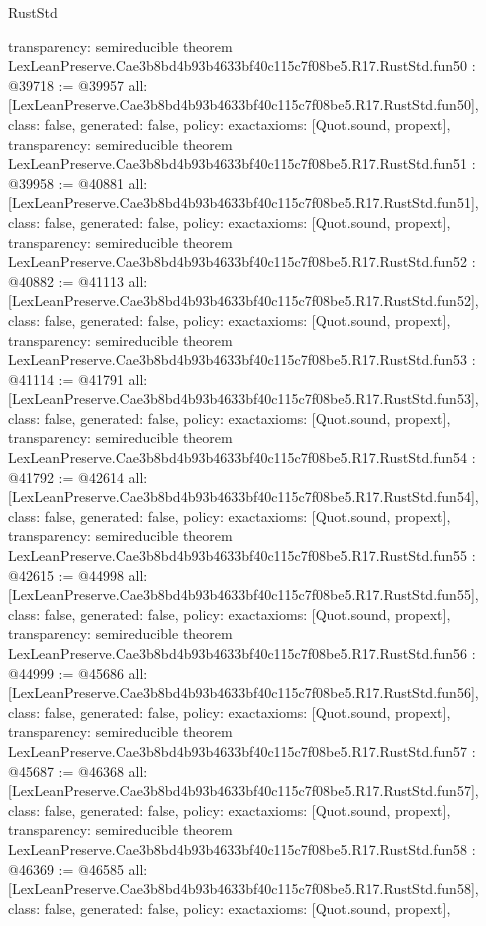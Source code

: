 \begin{lexlean}{RustStd}
\begin{coremodule}
{  transparency: semireducible
}
theorem LexLeanPreserve.Cae3b8bd4b93b4633bf40c115c7f08be5.R17.RustStd.fun50 : @39718 := @39957 {
  all: [LexLeanPreserve.Cae3b8bd4b93b4633bf40c115c7f08be5.R17.RustStd.fun50],
  class: false,
  generated: false,
  policy: exact{axioms: [Quot.sound, propext]},
  transparency: semireducible
}
theorem LexLeanPreserve.Cae3b8bd4b93b4633bf40c115c7f08be5.R17.RustStd.fun51 : @39958 := @40881 {
  all: [LexLeanPreserve.Cae3b8bd4b93b4633bf40c115c7f08be5.R17.RustStd.fun51],
  class: false,
  generated: false,
  policy: exact{axioms: [Quot.sound, propext]},
  transparency: semireducible
}
theorem LexLeanPreserve.Cae3b8bd4b93b4633bf40c115c7f08be5.R17.RustStd.fun52 : @40882 := @41113 {
  all: [LexLeanPreserve.Cae3b8bd4b93b4633bf40c115c7f08be5.R17.RustStd.fun52],
  class: false,
  generated: false,
  policy: exact{axioms: [Quot.sound, propext]},
  transparency: semireducible
}
theorem LexLeanPreserve.Cae3b8bd4b93b4633bf40c115c7f08be5.R17.RustStd.fun53 : @41114 := @41791 {
  all: [LexLeanPreserve.Cae3b8bd4b93b4633bf40c115c7f08be5.R17.RustStd.fun53],
  class: false,
  generated: false,
  policy: exact{axioms: [Quot.sound, propext]},
  transparency: semireducible
}
theorem LexLeanPreserve.Cae3b8bd4b93b4633bf40c115c7f08be5.R17.RustStd.fun54 : @41792 := @42614 {
  all: [LexLeanPreserve.Cae3b8bd4b93b4633bf40c115c7f08be5.R17.RustStd.fun54],
  class: false,
  generated: false,
  policy: exact{axioms: [Quot.sound, propext]},
  transparency: semireducible
}
theorem LexLeanPreserve.Cae3b8bd4b93b4633bf40c115c7f08be5.R17.RustStd.fun55 : @42615 := @44998 {
  all: [LexLeanPreserve.Cae3b8bd4b93b4633bf40c115c7f08be5.R17.RustStd.fun55],
  class: false,
  generated: false,
  policy: exact{axioms: [Quot.sound, propext]},
  transparency: semireducible
}
theorem LexLeanPreserve.Cae3b8bd4b93b4633bf40c115c7f08be5.R17.RustStd.fun56 : @44999 := @45686 {
  all: [LexLeanPreserve.Cae3b8bd4b93b4633bf40c115c7f08be5.R17.RustStd.fun56],
  class: false,
  generated: false,
  policy: exact{axioms: [Quot.sound, propext]},
  transparency: semireducible
}
theorem LexLeanPreserve.Cae3b8bd4b93b4633bf40c115c7f08be5.R17.RustStd.fun57 : @45687 := @46368 {
  all: [LexLeanPreserve.Cae3b8bd4b93b4633bf40c115c7f08be5.R17.RustStd.fun57],
  class: false,
  generated: false,
  policy: exact{axioms: [Quot.sound, propext]},
  transparency: semireducible
}
theorem LexLeanPreserve.Cae3b8bd4b93b4633bf40c115c7f08be5.R17.RustStd.fun58 : @46369 := @46585 {
  all: [LexLeanPreserve.Cae3b8bd4b93b4633bf40c115c7f08be5.R17.RustStd.fun58],
  class: false,
  generated: false,
  policy: exact{axioms: [Quot.sound, propext]},
}
\end{coremodule}
\end{lexlean}
